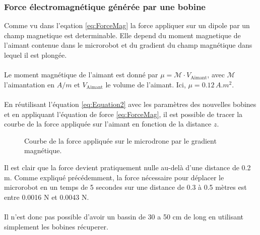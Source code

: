 \documentclass{article}
\begin{document}
\subsubsection{Force électromagnétique générée par une bobine}
Comme vu dans l'eqation \ref{eq:ForceMag} la force appliquer sur un dipole par un champ magnetique est determinable. Elle depend du moment magnetique de l'aimant contenue dans le microrobot et du gradient du champ magnétique dans lequel il est plongée. 
\\
\\
Le moment magnétique de l'aimant est donné par $\mu = \mathcal{M}\cdot V_{\text{Aimant}}$, avec $\mathcal{M}$ l'aimantation en $A/m$ et $V_{\text{Aimant}}$ le volume de l'aimant. Ici, $\mu = 0.12 \, A.m^2$.
\\
\\
En réutilisant l'équation \ref{eq:Equation2} avec les paramètres des nouvelles bobines et en appliquant l'équation de force \ref{eq:ForceMag}, il est possible de tracer la courbe de la force appliquée sur l'aimant en fonction de la distance $z$.
\begin{figure}[H]
        \centering
                    \caption{Courbe de la force appliquée sur le microdrone par le gradient magnétique.}
            \label{fig:courbe_force}
\end{figure}
\noindent
Il est clair que la force devient pratiquement nulle au-delà d'une distance de 0.2 m. Comme expliqué précédemment, la force nécessaire pour déplacer le microrobot en un temps de 5 secondes sur une distance de 0.3 à 0.5 mètres est entre 0.0016 N et 0.0043 N.
\\\\
Il n'est donc pas possible d'avoir un bassin de 30 a 50 cm de long en utilisant simplement les bobines récuperer.
\\\\
\end{document}
